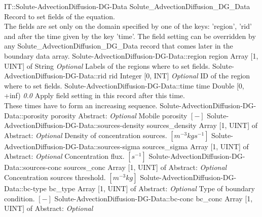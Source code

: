 \begin{RecordType}
	{IT::Solute-AdvectionDiffusion-DG-Data}
	{Solute{\_}AdvectionDiffusion{\_}DG{\_}Data}
	{} %
	{} %
	{{{Record to set fields of the equation.}\\{
The fields are set only on the domain specified by one of the keys: 'region', 'rid'}\\{
and after the time given by the key 'time'. The field setting can be overridden by}\\{
 any Solute{\_}AdvectionDiffusion{\_}DG{\_}Data record that comes later in the boundary data array.}}}
		\RecKey
			{Solute-AdvectionDiffusion-DG-Data::region}
			{region}
			{{Array [1, UINT] of }{String}}
			{ \it{Optional} }
			{{{Labels of the regions where to set fields. }}}
		\RecKey
			{Solute-AdvectionDiffusion-DG-Data::rid}
			{rid}
			{{Integer [0, INT]}}
			{ \it{Optional} }
			{{{ID of the region where to set fields.}}}
		\RecKey
			{Solute-AdvectionDiffusion-DG-Data::time}
			{time}
			{{Double [0, +inf)}}
			{ \it{0.0} }
			{{{Apply field setting in this record after this time.}\\{
These times have to form an increasing sequence.}}}
		\RecKey
			{Solute-AdvectionDiffusion-DG-Data::porosity}
			{porosity}
			{{Abstract}{: }}
			{ \it{Optional} }
			{{{Mobile porosity }{$[-]$}}}
		\RecKey
			{Solute-AdvectionDiffusion-DG-Data::sources-density}
			{sources{\_}density}
			{{Array [1, UINT] of }{Abstract}{: }}
			{ \it{Optional} }
			{{{Density of concentration sources. }{$[m^{-3}kgs^{-1}]$}}}
		\RecKey
			{Solute-AdvectionDiffusion-DG-Data::sources-sigma}
			{sources{\_}sigma}
			{{Array [1, UINT] of }{Abstract}{: }}
			{ \it{Optional} }
			{{{Concentration flux. }{$[s^{-1}]$}}}
		\RecKey
			{Solute-AdvectionDiffusion-DG-Data::sources-conc}
			{sources{\_}conc}
			{{Array [1, UINT] of }{Abstract}{: }}
			{ \it{Optional} }
			{{{Concentration sources threshold. }{$[m^{-3}kg]$}}}
		\RecKey
			{Solute-AdvectionDiffusion-DG-Data::bc-type}
			{bc{\_}type}
			{{Array [1, UINT] of }{Abstract}{: }}
			{ \it{Optional} }
			{{{Type of boundary condition. }{$[-]$}}}
		\RecKey
			{Solute-AdvectionDiffusion-DG-Data::bc-conc}
			{bc{\_}conc}
			{{Array [1, UINT] of }{Abstract}{: }}
			{ \it{Optional} }

\end{RecordType}
